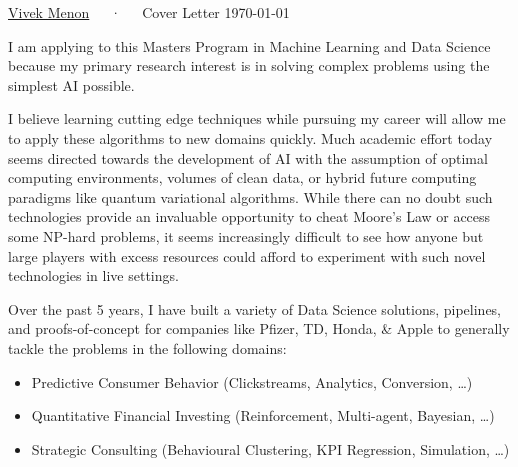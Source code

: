 \documentclass[11pt, a4paper]{awesome-cv}
\begin{document}
\makecvheader[R]

\makecvfooter
{\thepage} %
{\href{https://vvkmnn.xyz/}{Vivek Menon}~~~·~~~Cover Letter}
{\today}%



\begin{cvletter}


I am applying to this Masters Program in Machine Learning and Data
Science because my primary research interest is in solving complex problems
using the simplest AI possible.

I believe learning cutting edge techniques while pursuing my career will allow me
to apply these algorithms to new domains quickly. Much academic effort today seems directed towards the development of AI with the assumption of optimal computing environments, volumes of clean data, or hybrid future computing paradigms like quantum variational algorithms. While
there can no doubt such technologies provide an invaluable opportunity to cheat
Moore's Law or access some NP-hard problems, it seems increasingly difficult to
see how anyone but large players with excess resources could afford to
experiment with such novel technologies in live settings.

Over the past 5 years, I have built a variety of Data Science solutions, pipelines, and proofs-of-concept for companies like Pfizer, TD, Honda, \& Apple to generally tackle the problems in the following domains:

\begin{itemize}
\item Predictive Consumer Behavior (Clickstreams, Analytics, Conversion, \ldots{})
\item Quantitative Financial Investing (Reinforcement, Multi-agent, Bayesian, \ldots{})
\item Strategic Consulting (Behavioural Clustering, KPI Regression, Simulation, \ldots{})
\end{itemize}


\end{cvletter}
\end{document}
